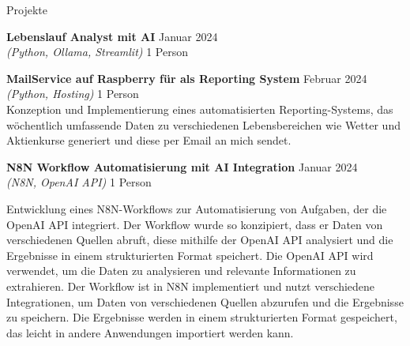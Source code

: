 \documentclass{resume} %
\begin{document}

\begin{rSection}{Projekte}
    \vspace{0.5em}

    
    \begin{adjustwidth}{0.5cm}{}
        \vspace{-1.5em}

        \item \textbf{Lebenslauf Analyst mit AI} \hfill {Januar 2024} \\
        \textit{(Python, Ollama, Streamlit)} \hfill {1 Person}\\

        \item \textbf{MailService auf Raspberry für als Reporting System} \hfill {Februar 2024} \\
        \textit{(Python, Hosting)} \hfill {1 Person}\\
        {Konzeption und Implementierung eines automatisierten Reporting-Systems, das wöchentlich umfassende Daten zu verschiedenen Lebensbereichen wie Wetter und Aktienkurse generiert und diese per Email an mich sendet.}
        

        \item \textbf{N8N Workflow Automatisierung mit AI Integration} \hfill {Januar 2024} \\
        \textit{(N8N, OpenAI API)} \hfill {1 Person}\\
        \raggedright{Entwicklung eines N8N-Workflows zur Automatisierung von Aufgaben, der die OpenAI API integriert.
        Der Workflow wurde so konzipiert, dass er Daten von verschiedenen Quellen abruft, diese mithilfe der OpenAI API analysiert und die Ergebnisse in einem strukturierten Format speichert.
        Die OpenAI API wird verwendet, um die Daten zu analysieren und relevante Informationen zu extrahieren.
        Der Workflow ist in N8N implementiert und nutzt verschiedene Integrationen, um Daten von verschiedenen Quellen abzurufen und die Ergebnisse zu speichern.
        Die Ergebnisse werden in einem strukturierten Format gespeichert, das leicht in andere Anwendungen importiert werden kann.}


\end{adjustwidth}
\end{rSection}
\end{document}

